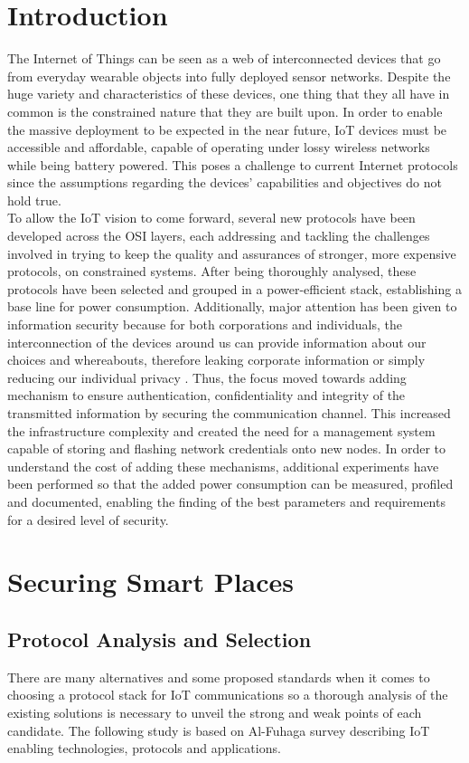 \documentclass{sig-alternate-05-2015}
\begin{document}
\section{Introduction}
The Internet of Things can be seen as a web of interconnected devices that go from everyday wearable objects into fully deployed sensor networks. Despite the huge variety and characteristics of these devices, one thing that they all have in common is the constrained nature that they are built upon. In order to enable the massive deployment to be expected in the near future, \gls{IoT} devices must be accessible and affordable, capable of operating under lossy wireless networks while being battery powered. This poses a challenge to current Internet protocols since the assumptions regarding the devices' capabilities and objectives do not hold true.\\ To allow the \gls{IoT} vision to come forward, several new protocols have been developed across the OSI layers, each addressing and tackling the challenges involved in trying to keep the quality and assurances of stronger, more expensive protocols, on constrained systems. After being thoroughly analysed, these protocols have been selected and grouped in a power-efficient stack, establishing a base line for power consumption.
Additionally, major attention has been given to information security because for both corporations and individuals, the interconnection of the devices around us can provide information about our choices and whereabouts, therefore leaking corporate information or simply reducing our individual privacy \cite{Ukil2015}. Thus, the focus moved towards adding mechanism to ensure authentication, confidentiality and integrity of the transmitted information by securing the communication channel. This increased the infrastructure complexity and created the need for a management system capable of storing and flashing network credentials onto new nodes.
In order to understand the cost of adding these mechanisms, additional experiments have been performed so that the added power consumption can be measured, profiled and documented, enabling the finding of the best parameters and requirements for a desired level of security.

\section{Securing Smart Places}

\subsection{Protocol Analysis and Selection}
There are many alternatives and some proposed standards when it comes to choosing a protocol stack for \gls{IoT} communications so a thorough analysis of the existing solutions is necessary to unveil the strong and weak points of each candidate. The following study is based on Al-Fuhaga survey\cite{Al-Fuqaha2015} describing \gls{IoT} enabling technologies, protocols and applications. 
\end{document}
